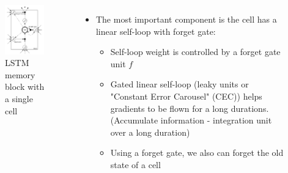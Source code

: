 \documentclass{beamer}
\begin{document}
{
	\begin{columns}
		\begin{figure}[ht]  
			\begin{center}
				\includegraphics[width=1.8in]{Images/LSTM_detail.png}   
			\end{center}   
			\caption{\centering LSTM memory block with a single cell}
		\end{figure}
		\begin{itemize}
		\item The most important component is the cell has a linear self-loop with forget gate: 
		\begin{itemize}
			\item Self-loop weight is controlled by a forget gate unit ${ f }$
			\item Gated linear self-loop (leaky units or "Constant Error Carousel" (CEC)) helps gradients to be flown for a long durations. (Accumulate information - integration unit over a long duration) 
			\item Using a forget gate, we also can forget the old state of a cell 
		\end{itemize}
		\end{itemize}
	\end{columns}
}
\frame
\end{document}
